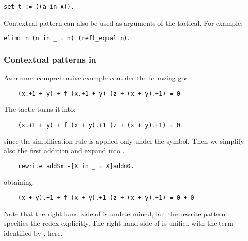 \begin{lstlisting}
set t := ((a in A)).
\end{lstlisting}

Contextual pattern can also be used as arguments of the \ssrC{:} tactical.
For example:
\begin{lstlisting}
elim: n (n in _ = n) (refl_equal n).
\end{lstlisting}

\subsubsection{Contextual patterns in }
As a more comprehensive example consider the following goal:
\begin{lstlisting}
    (x.+1 + y) + f (x.+1 + y) (z + (x + y).+1) = 0
\end{lstlisting}
The tactic  turns it into:
\begin{lstlisting}
    (x.+1 + y) + f (x + y).+1 (z + (x + y).+1) = 0
\end{lstlisting}
since the simplification rule  is applied only under the  symbol.
Then we simplify also the first addition and expand  into .
\begin{lstlisting}
    rewrite addSn -[X in _ = X]addn0.
\end{lstlisting}
obtaining:
\begin{lstlisting}
    (x + y).+1 + f (x + y).+1 (z + (x + y).+1) = 0 + 0
\end{lstlisting}
Note that the right hand side of  is undetermined, but the
rewrite pattern specifies the redex explicitly. The right hand side of
 is unified with the term identified by ,  here.


